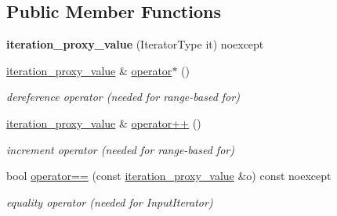 \subsection*{Public Member Functions}
\begin{DoxyCompactItemize}
\item 
\mbox{\label{classnlohmann_1_1detail_1_1iteration__proxy__value_a459dd8961b80b2089d8161c9aa466581}} 
{\bfseries iteration\+\_\+proxy\+\_\+value} (Iterator\+Type it) noexcept
\item 
\mbox{\label{classnlohmann_1_1detail_1_1iteration__proxy__value_a10accadf05a172fdc69a016bec201e81}} 
\hyperlink{classnlohmann_1_1detail_1_1iteration__proxy__value}{iteration\+\_\+proxy\+\_\+value} \& \hyperlink{classnlohmann_1_1detail_1_1iteration__proxy__value_a10accadf05a172fdc69a016bec201e81}{operator$\ast$} ()
\begin{DoxyCompactList}\small\item\em dereference operator (needed for range-\/based for) \end{DoxyCompactList}\item 
\mbox{\label{classnlohmann_1_1detail_1_1iteration__proxy__value_adf4db2aef31822f3a179435158a4de11}} 
\hyperlink{classnlohmann_1_1detail_1_1iteration__proxy__value}{iteration\+\_\+proxy\+\_\+value} \& \hyperlink{classnlohmann_1_1detail_1_1iteration__proxy__value_adf4db2aef31822f3a179435158a4de11}{operator++} ()
\begin{DoxyCompactList}\small\item\em increment operator (needed for range-\/based for) \end{DoxyCompactList}\item 
\mbox{\label{classnlohmann_1_1detail_1_1iteration__proxy__value_a6c357593623abb0ae3fee49a25255ca4}} 
bool \hyperlink{classnlohmann_1_1detail_1_1iteration__proxy__value_a6c357593623abb0ae3fee49a25255ca4}{operator==} (const \hyperlink{classnlohmann_1_1detail_1_1iteration__proxy__value}{iteration\+\_\+proxy\+\_\+value} \&o) const noexcept
\begin{DoxyCompactList}\small\item\em equality operator (needed for Input\+Iterator) \end{DoxyCompactList}\item 

\end{DoxyCompactItemize}
